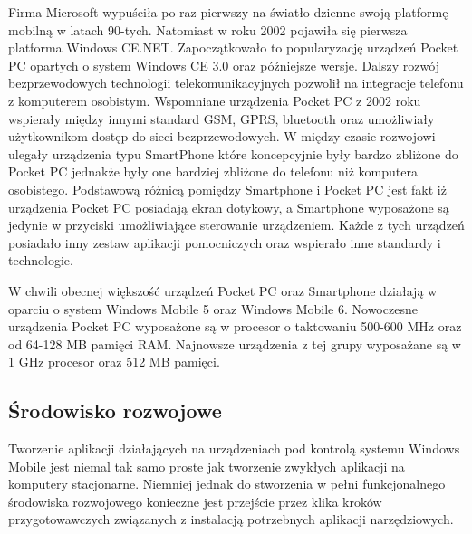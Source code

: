 Firma Microsoft wypuściła po raz pierwszy na światło dzienne swoją platformę
mobilną w latach 90-tych\cite{blog:wm-app-dev}. Natomiast w roku 2002 pojawiła
się pierwsza platforma Windows CE.NET. Zapoczątkowało to popularyzację urządzeń Pocket PC opartych o
system Windows CE 3.0 oraz późniejsze wersje. Dalszy rozwój bezprzewodowych
technologii telekomunikacyjnych pozwolił na integracje telefonu z komputerem
osobistym. Wspomniane urządzenia Pocket PC z 2002 roku wspierały między innymi
standard GSM, GPRS, bluetooth oraz umożliwiały użytkownikom dostęp do sieci
bezprzewodowych. W między czasie rozwojowi ulegały urządzenia typu SmartPhone
które koncepcyjnie były bardzo zbliżone do Pocket PC jednakże były one bardziej
zbliżone do telefonu niż komputera osobistego. Podstawową różnicą pomiędzy
Smartphone i Pocket PC jest fakt iż urządzenia Pocket PC posiadają ekran
dotykowy, a Smartphone wyposażone są jedynie w przyciski umożliwiające sterowanie
urządzeniem. Każde z tych urządzeń posiadało inny zestaw aplikacji pomocniczych
oraz wspierało inne standardy i technologie.

W chwili obecnej większość urządzeń Pocket PC oraz Smartphone działają w oparciu
o system Windows Mobile 5 oraz Windows Mobile 6. Nowoczesne urządzenia Pocket PC
wyposażone są w procesor o taktowaniu 500-600 MHz oraz od 64-128 MB pamięci RAM.
Najnowsze urządzenia z tej grupy wyposażane są w 1 GHz procesor oraz 512 MB
pamięci.

\subsection{Środowisko rozwojowe}
Tworzenie aplikacji działających na urządzeniach pod kontrolą systemu Windows
Mobile jest niemal tak samo proste jak tworzenie zwykłych aplikacji na komputery
stacjonarne. Niemniej jednak do stworzenia w pełni funkcjonalnego środowiska
rozwojowego konieczne jest przejście przez klika kroków przygotowawczych
związanych z instalacją potrzebnych aplikacji narzędziowych. 

